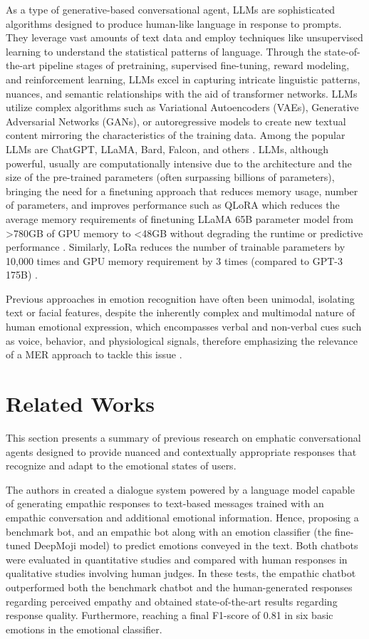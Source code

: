 \documentclass[runningheads]{llncs}
\begin{document}
As a type of generative-based conversational agent, LLMs are sophisticated algorithms designed to produce human-like language in response to prompts. They leverage vast amounts of text data and employ techniques like unsupervised learning to understand the statistical patterns of language. Through the state-of-the-art pipeline stages of pretraining, supervised fine-tuning, reward modeling, and reinforcement learning, LLMs excel in capturing intricate linguistic patterns, nuances, and semantic relationships with the aid of transformer networks. LLMs utilize complex algorithms such as Variational Autoencoders (VAEs), Generative Adversarial Networks (GANs), or autoregressive models to create new textual content mirroring the characteristics of the training data. Among the popular LLMs are ChatGPT, LLaMA, Bard, Falcon, and others \cite{Hai_LLM_2023}. LLMs, although powerful, usually are computationally intensive due to the architecture and the size of the pre-trained parameters (often surpassing billions of parameters), bringing the need for a finetuning approach that reduces memory usage, number of parameters, and improves performance such as QLoRA which reduces the average memory requirements of finetuning  LLaMA 65B parameter model from >780GB of GPU memory to <48GB without degrading the runtime or predictive performance \cite{dettmers_qlora_2023}. Similarly, LoRa reduces the number of trainable parameters by 10,000 times and GPU memory requirement by 3 times (compared to GPT-3 175B) \cite{hu_lora_2021}. 

Previous approaches in emotion recognition have often been unimodal, isolating text or facial features, despite the inherently complex and multimodal nature of human emotional expression, which encompasses verbal and non-verbal cues such as voice, behavior, and physiological signals, therefore emphasizing the relevance of a MER approach to tackle this issue \cite{ezzameli_emotion_2023, zhu_multimodal_2023}.

\section{Related Works}

This section presents a summary of previous research on emphatic conversational agents designed to provide nuanced and contextually appropriate responses that recognize and adapt to the emotional states of users.

The authors in \cite{casas_enhancing_2021} created a dialogue system powered by a language model capable of generating empathic responses to text-based messages trained with an empathic conversation and additional emotional information. Hence, proposing a benchmark bot, and an empathic bot along with an emotion classifier (the fine-tuned DeepMoji model) to predict emotions conveyed in the text. Both chatbots were evaluated in quantitative studies and compared with human responses in qualitative studies involving human judges. In these tests, the empathic chatbot outperformed both the benchmark chatbot and the human-generated responses regarding perceived empathy and obtained state-of-the-art results regarding response quality. Furthermore, reaching a final F1-score of 0.81 in six basic emotions in the emotional classifier.
\end{document}
